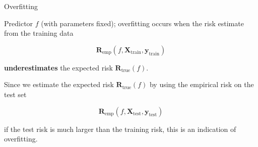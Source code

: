 \documentclass[12pt]{beamer}
\begin{document}
\begin{frame}{Overfitting}

Predictor $f$ (with parameters fixed); overfitting occurs when the risk estimate from the training data 

$$
\mathbf{R}_{\mathrm{emp}} (f, \mathbf{X}_{\mathrm{train}}, \mathbf{y}_{\mathrm{train}})
$$

\textbf{underestimates} the expected risk  $\mathbf{R}_{\mathrm{true}} (f)$.
 
Since we estimate the expected risk  $\mathbf{R}_{\mathrm{true}} (f)$ by using the empirical risk on the test set 


$$
\mathbf{R}_{\mathrm{emp}} (f, \mathbf{X}_{\mathrm{test}}, \mathbf{y}_{\mathrm{test}})
$$

if the test risk is much larger than the training risk, this is an indication of overfitting.
	
\end{frame}
\end{document}

